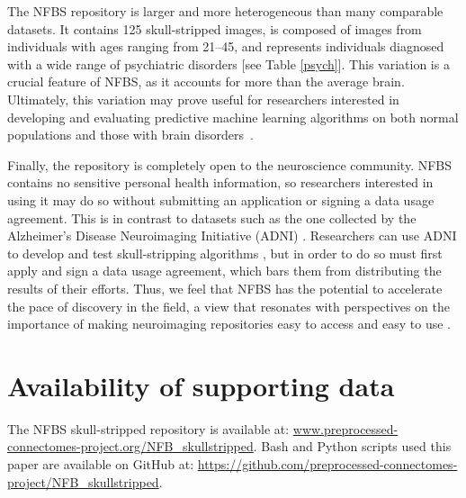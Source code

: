 The NFBS repository is larger and more heterogeneous than many comparable datasets. It contains 125 skull-stripped images, is composed of images from individuals with ages ranging from 21--45, and represents individuals diagnosed with a wide range of psychiatric disorders [see Table \ref{psych}]. This variation is a crucial feature of NFBS, as it accounts for more than the average brain. Ultimately, this variation may prove useful for researchers interested in developing and evaluating predictive machine learning algorithms on both normal populations and those with brain disorders~\cite{gabrieli2015prediction}.

Finally, the repository is completely open to the neuroscience community. NFBS contains no sensitive personal health information, so researchers interested in using it may do so without submitting an application or signing a data usage agreement. This is in contrast to datasets such as the one collected by the Alzheimer's Disease Neuroimaging Initiative (ADNI) \cite{pmid17476317}. Researchers can use ADNI to develop and test skull-stripping algorithms \cite{pmid21195780}, but in order to do so must first apply and sign a data usage agreement, which bars them from distributing the results of their efforts. Thus, we feel that NFBS has the potential to accelerate the pace of discovery in the field, a view that resonates with perspectives on the importance of making neuroimaging repositories easy to access and easy to use \cite{Nichols054262}.

\section*{Availability of supporting data}
The NFBS skull-stripped repository is available at: \DIFdelbegin %
\DIFdelend \DIFaddbegin \url{www.preprocessed-connectomes-project.org/NFB\_skullstripped}\DIFaddend . Bash and Python scripts used \DIFdelbegin {}\DIFdelend \DIFaddbegin {}\DIFaddend this paper are available on GitHub at: \url{https://github.com/preprocessed-connectomes-project/NFB\_skullstripped}.
